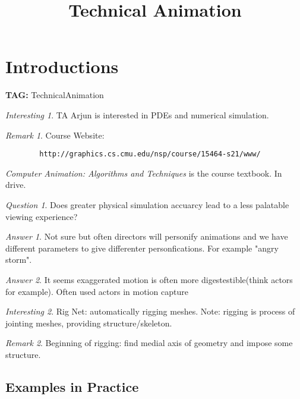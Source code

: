 \documentclass[11pt]{article}
\title{Technical Animation}
\theoremstyle{remark}
\newtheorem{remark}{Remark}
\newtheorem{quest}{Question}
\newtheorem{ans}{Answer}
\newtheorem{interest}{Interesting}
\begin{document}
\maketitle

\section{Introductions}

\textbf{TAG:} TechnicalAnimation

\begin{interest}
	TA Arjun is interested in PDEs and numerical simulation.
\end{interest}

\begin{remark}
	Course Website:
	\begin{verbatim}
		http://graphics.cs.cmu.edu/nsp/course/15464-s21/www/
	\end{verbatim}

	\textit{Computer Animation: Algorithms and Techniques} is the course textbook. In drive.
\end{remark}

\begin{quest}
	Does greater physical simulation accuarcy lead to a less palatable viewing experience? 
\end{quest}

\begin{ans}
	Not sure but often directors will personify animations and we have different parameters to give differenter personfications. For example "angry storm".
\end{ans}

\begin{ans}
	It seems exaggerated motion is often more digestestible(think actors for example). Often used actors in motion capture
\end{ans}

\begin{interest}
	Rig Net: automatically rigging meshes. Note: rigging is process of jointing meshes, providing structure/skeleton.
\end{interest}

\begin{remark}
	Beginning of rigging: find medial axis of geometry and impose some structure.
\end{remark}

\subsection{Examples in Practice}
\end{document}
